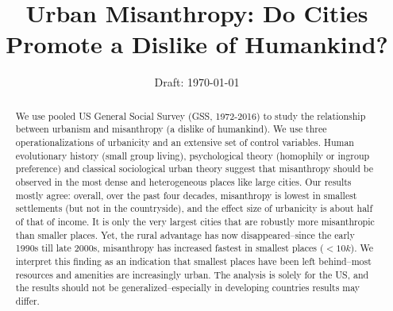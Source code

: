 \documentclass[10pt, letterpaper]{article}
\date{Draft: {}\today}
\title{  %
  Urban Misanthropy: Do Cities Promote a Dislike of Humankind?
}
\author{
}
\begin{document}


\maketitle
\vspace{-.4in}
\begin{center}

\end{center}


\begin{abstract}
\noindent 
We use pooled US General Social Survey (GSS, 1972-2016) to study 
the relationship between urbanism and misanthropy (a dislike of humankind). We use three operationalizations of urbanicity and an extensive set of control variables. 
Human evolutionary history (small group living),  psychological theory
(homophily or ingroup preference) and classical sociological urban theory  
suggest that misanthropy should be observed in the most dense and
heterogeneous places like large cities. Our results mostly agree: overall, over
the past four decades, misanthropy is lowest in smallest settlements (but not in
 the countryside), and the effect size of urbanicity is about half of that of
 income.
 It is only the very largest cities that are
robustly more misanthropic than smaller places.
Yet, the rural
advantage has now disappeared--since the early 1990s till late 2000s, misanthropy has
increased fastest in smallest places ($<10k$). We interpret this finding as an
indication that smallest places have been left behind--most resources and
amenities are increasingly urban.  The analysis is solely for the
US, and the results should not be generalized--especially in  developing
countries results may differ.
\end{abstract}
\vspace{.15in} 
\end{document}
